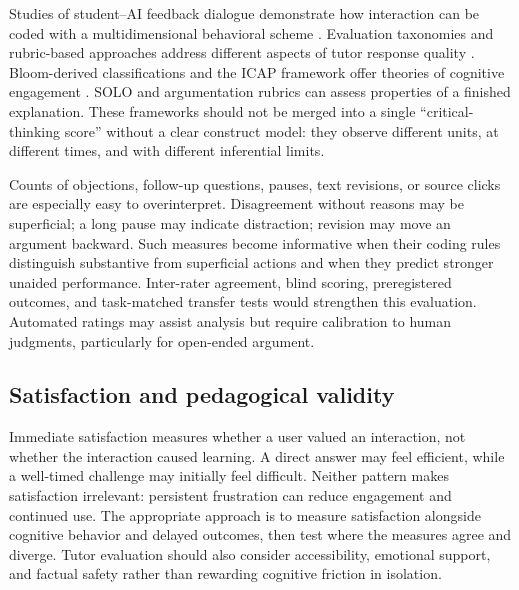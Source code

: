 \documentclass[11pt,a4paper]{article}
\begin{document}
Studies of student--AI feedback dialogue demonstrate how interaction can be coded with a multidimensional behavioral scheme \cite{P11}. Evaluation taxonomies and rubric-based approaches address different aspects of tutor response quality \cite{P29,P32,P50}. Bloom-derived classifications and the ICAP framework offer theories of cognitive engagement \cite{P42,P54}. SOLO and argumentation rubrics can assess properties of a finished explanation. These frameworks should not be merged into a single ``critical-thinking score'' without a clear construct model: they observe different units, at different times, and with different inferential limits.

Counts of objections, follow-up questions, pauses, text revisions, or source clicks are especially easy to overinterpret. Disagreement without reasons may be superficial; a long pause may indicate distraction; revision may move an argument backward. Such measures become informative when their coding rules distinguish substantive from superficial actions and when they predict stronger unaided performance. Inter-rater agreement, blind scoring, preregistered outcomes, and task-matched transfer tests would strengthen this evaluation. Automated ratings may assist analysis but require calibration to human judgments, particularly for open-ended argument.

\subsection{Satisfaction and pedagogical validity}
Immediate satisfaction measures whether a user valued an interaction, not whether the interaction caused learning. A direct answer may feel efficient, while a well-timed challenge may initially feel difficult. Neither pattern makes satisfaction irrelevant: persistent frustration can reduce engagement and continued use. The appropriate approach is to measure satisfaction alongside cognitive behavior and delayed outcomes, then test where the measures agree and diverge. Tutor evaluation should also consider accessibility, emotional support, and factual safety rather than rewarding cognitive friction in isolation.
\end{document}
